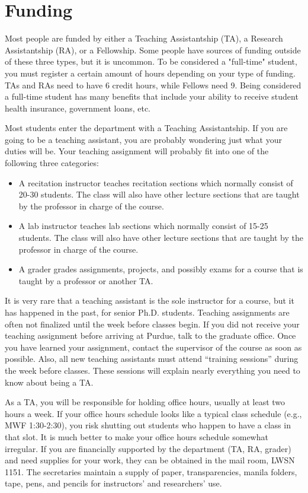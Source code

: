\section{Funding}

Most people are funded by either a Teaching Assistantship (TA), a Research Assistantship (RA), or a Fellowship. Some people have sources of funding outside of these three types, but it is uncommon. To be considered a "full-time" student, you must register a certain amount of hours depending on your type of funding. TAs and RAs need to have 6 credit hours, while Fellows need 9. Being considered a full-time student has many benefits that include your ability to receive student health insurance, government loans, etc.

Most students enter the department with a Teaching Assistantship. If you are going to be a teaching assistant, you are probably wondering just what your duties will be. Your teaching assignment will probably fit into one of the following three categories:

\begin{itemize}
	\item A recitation instructor teaches recitation sections which normally consist of 20-30 students. The class will also have other lecture sections that are taught by the professor in charge of the course.
	\item A lab instructor teaches lab sections which normally consist of 15-25 students. The class will also have other lecture sections that are taught by the professor in charge of the course.
	\item A grader grades assignments, projects, and possibly exams for a course that is taught by a professor or another TA.
\end{itemize}

It is very rare that a teaching assistant is the sole instructor for a course, but it has happened in the past, for senior Ph.D. students. Teaching assignments are often not finalized until the week before classes begin. If you did not receive your teaching assignment before arriving at Purdue, talk to the graduate office. Once you have learned your assignment, contact the supervisor of the course as soon as possible. Also, all new teaching assistants must attend ``training sessions'' during the week before classes. These sessions will explain nearly everything you need to know about being a TA.

As a TA, you will be responsible for holding office hours, usually at least two hours a week. If your office hours schedule looks like a typical class schedule (e.g., MWF 1:30-2:30), you risk shutting out students who happen to have a class in that slot. It is much better to make your office hours schedule somewhat irregular. If you are financially supported by the department (TA, RA, grader) and need supplies for your work, they can be obtained in the mail room, LWSN 1151. The secretaries maintain a supply of paper, transparencies, manila folders, tape, pens, and pencils for instructors' and researchers' use.

